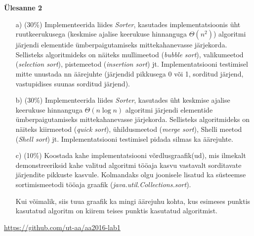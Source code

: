 \documentclass[a4paper]{article}
\begin{document}
\begin{problem}
\textbf{Ülesanne 2}

\begin{enumerate}
\item[a)] (30\%) Implementeerida liides \textit{Sorter}, kasutades implementatsioonis üht ruutkeerukusega
(keskmise ajalise keerukuse hinnanguga $\Theta(n^2)$) algoritmi järjendi elementide
ümberpaigutamiseks mittekahanevasse järjekorda.  Sellisteks
algoritmideks on näiteks mullimeetod ({\it bubble sort}), valikumeetod
({\it selection sort}), pistemeetod ({\it insertion sort}) jt.
Implementatsiooni testimisel mitte unustada nn äärejuhte (järjendid pikkusega 0 või 1, sorditud järjend, vastupidises suunas sorditud
järjend).
\item[b)] (30\%) Implementeerida liides \textit{Sorter}, kasutades üht keskmise ajalise
keerukuse hinnanguga  $ \Theta(n\log n)$ algoritmi järjendi elementide
ümberpaigutamiseks mittekahanevasse järjekorda. Sellisteks algoritmideks
on näiteks kiirmeetod ({\it quick sort}), ühildusmeetod ({\it merge
sort}), Shelli meetod ({\it Shell sort}) jt. Implementatsiooni testimisel pidada silmas ka äärejuhte.
\item[c)] (10\%) Koostada kahe implementatsiooni võrdlusgraafik(ud), mis ilmekalt
demonstreeriksid kahe valitud algoritmi tööaja kasvu vastavalt sorditavate järjendite pikkuste kasvule. Kolmandaks olgu joonisele lisatud ka süsteemse sortimismeetodi tööaja graafik (\textit{java.util.Collections.sort}). 

Kui võimalik, siis tuua graafik ka mingi äärejuhu kohta, kus esimeses punktis kasutatud algoritm on kiirem teises punktis kasutatud algoritmist.
\end{enumerate}
\end{problem}

\url{https://github.com/ut-aa/aa2016-lab1}
\end{document}
